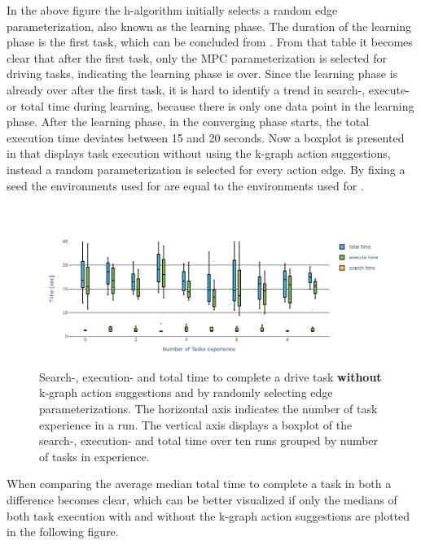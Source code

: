 In the above figure the \ac{h-algorithm} initially selects a random edge parameterization, also known as the learning phase. The duration of the learning phase is the first task, which can be concluded from . From that table it becomes clear that after the first task, only the \ac{MPC} parameterization is selected for driving tasks, indicating the learning phase is over. Since the learning phase is already over after the first task, it is hard to identify a trend in search-, execute- or total time during learning, because there is only one data point in the learning phase. After the learning phase, in the converging phase starts, the total execution time deviates between 15 and 20 seconds. Now a boxplot is presented in  that displays task execution without using the \ac{k-graph} action suggestions, instead a random parameterization is selected for every action edge. By fixing a seed the environments used for  are equal to the environments used for .\bs

\begin{figure}[H]
    \centering
    \includegraphics[width=\textwidth]{figures/results/random_drive_time_no_k-graph}
    \caption{Search-, execution- and total time to complete a drive task \textbf{without} \ac{k-graph} action suggestions and by randomly selecting edge parameterizations. The horizontal axis indicates the number of task experience in a run. The vertical axis displays a boxplot of the search-, execution- and total time over ten runs grouped by number of tasks in experience. }%
   \label{fig:random_drive_time_no_k-graph}
\end{figure}

When comparing the average median total time to complete a task in both  a difference becomes clear, which can be better visualized if only the medians of both task execution with and without the \ac{k-graph} action suggestions are plotted in the following figure.\bs


